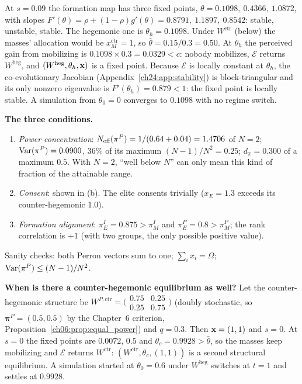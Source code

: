 \documentclass[../solutions_manual.tex]{subfiles}
\begin{document}
At $s = 0.09$ the formation map has three fixed points, $\theta = 0.1098,\ 0.4366,\ 1.0872$, with slopes $F'(\theta) = \rho + (1-\rho)g'(\theta) = 0.8791,\ 1.1897,\ 0.8542$: stable, unstable, stable. The hegemonic one is $\theta_h = 0.1098$. Under $W^{\text{ctr}}$ (below) the masses' allocation would be $x_M^{\text{ctr}} = 1$, so $\bar\theta = 0.15/0.3 = 0.50$. At $\theta_h$ the perceived gain from mobilizing is $0.1098 \times 0.3 = 0.0329 < c$: nobody mobilizes, $\mathcal{E}$ returns $W^{\text{heg}}$, and $(W^{\text{heg}}, \theta_h, \mathbf{x})$ is a fixed point. Because $\mathcal{E}$ is locally constant at $\theta_h$, the co-evolutionary Jacobian (Appendix~\ref{ch24:app:stability}) is block-triangular and its only nonzero eigenvalue is $F'(\theta_h) = 0.879 < 1$: the fixed point is locally stable. A simulation from $\theta_0 = 0$ converges to $0.1098$ with no regime switch.

 \textbf{The three conditions.}
\begin{enumerate}
\item \emph{Power concentration}: $N_{\text{eff}}(\pi^P) = 1/(0.64 + 0.04) = 1.4706$ of $N = 2$; $\operatorname{Var}(\pi^P) = 0.0900$, 36\% of its maximum $(N-1)/N^2 = 0.25$; $d_\pi = 0.300$ of a maximum $0.5$. With $N = 2$, ``well below $N$'' can only mean this kind of fraction of the attainable range.
\item \emph{Consent}: shown in (b). The elite consents trivially ($x_E = 1.3$ exceeds its counter-hegemonic $1.0$).
\item \emph{Formation alignment}: $\pi^I_E = 0.875 > \pi^I_M$ and $\pi^P_E = 0.8 > \pi^P_M$; the rank correlation is $+1$ (with two groups, the only possible positive value).
\end{enumerate}
Sanity checks: both Perron vectors sum to one; $\sum_i x_i = \Omega$; $\operatorname{Var}(\pi^P) \le (N-1)/N^2$.

 \textbf{When is there a counter-hegemonic equilibrium as well?} Let the counter-hegemonic structure be $W^{P,\text{ctr}} = \bigl(\begin{smallmatrix}0.75&0.25\\0.25&0.75\end{smallmatrix}\bigr)$ (doubly stochastic, so $\boldsymbol{\pi}^P = (0.5, 0.5)$ by the Chapter~6 criterion, Proposition~\ref{ch06:prop:equal_power}) and $q = 0.3$. Then $\mathbf{x} = (1, 1)$ and $s = 0$. At $s = 0$ the fixed points are $0.0072$, $0.5$ and $\theta_c = 0.9928 > \bar\theta$, so the masses keep mobilizing and $\mathcal{E}$ returns $W^{\text{ctr}}$: $(W^{\text{ctr}}, \theta_c, (1,1))$ is a second structural equilibrium. A simulation started at $\theta_0 = 0.6$ under $W^{\text{heg}}$ switches at $t = 1$ and settles at $0.9928$.
\end{document}
